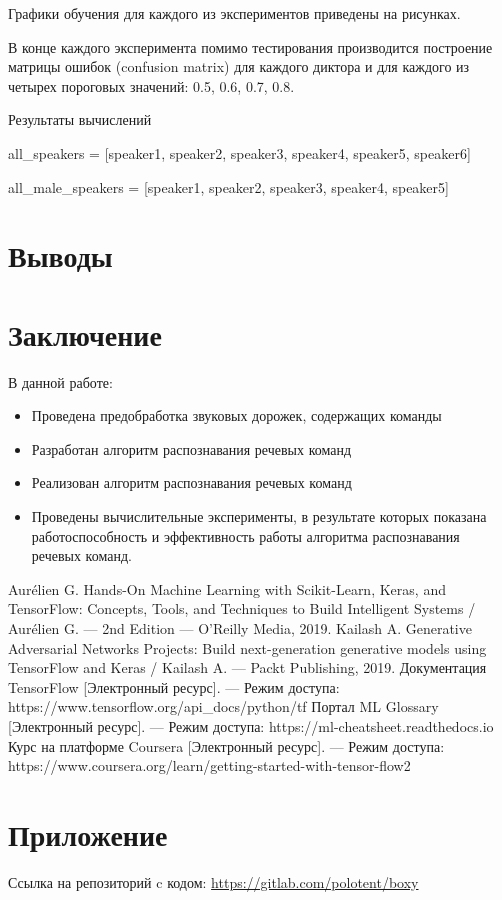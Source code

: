 \documentclass[14pt]{article}
\begin{document}
Графики обучения для каждого из экспериментов приведены на рисунках.

В конце каждого эксперимента помимо тестирования производится построение матрицы ошибок (confusion matrix) для каждого диктора и для каждого из четырех пороговых значений: 0.5, 0.6, 0.7, 0.8.
\\

\begin{table}
\centering
{}
\caption{Результаты вычислений}
\end{table}


all\_speakers = [speaker1, speaker2, speaker3, speaker4, speaker5, speaker6]

all\_male\_speakers = [speaker1, speaker2, speaker3, speaker4, speaker5]

\newpage


\section*{Выводы}
\newpage

\section*{Заключение}
В данной работе:
\begin{itemize}[leftmargin=2cm]
\item Проведена предобработка звуковых дорожек, содержащих команды
\item Разработан алгоритм распознавания речевых команд
\item Реализован алгоритм распознавания речевых команд
\item Проведены вычислительные эксперименты, в результате которых	 показана работоспособность и эффективность работы алгоритма распознавания речевых команд.
\end{itemize}
\newpage

\begin{thebibliography}{3}
Aurélien G. Hands-On Machine Learning with Scikit-Learn, Keras, and TensorFlow: Concepts, Tools, and Techniques to Build Intelligent Systems / Aurélien G. --- 2nd Edition --- O'Reilly Media, 2019.
Kailash A. Generative Adversarial Networks Projects: Build next-generation generative models using TensorFlow and Keras / Kailash A. ---  Packt Publishing, 2019.
Документация TensorFlow [Электронный ресурс]. --- Режим доступа: https://www.tensorflow.org/api\_docs/python/tf
Портал ML Glossary [Электронный ресурс]. --- Режим доступа: https://ml-cheatsheet.readthedocs.io
Курс на платформе Coursera [Электронный ресурс]. --- Режим доступа: https://www.coursera.org/learn/getting-started-with-tensor-flow2
\end{thebibliography}
\newpage

\section*{Приложение}
Ссылка на репозиторий c кодом: \url{https://gitlab.com/polotent/boxy}
\restoregeometry
\end{document}
